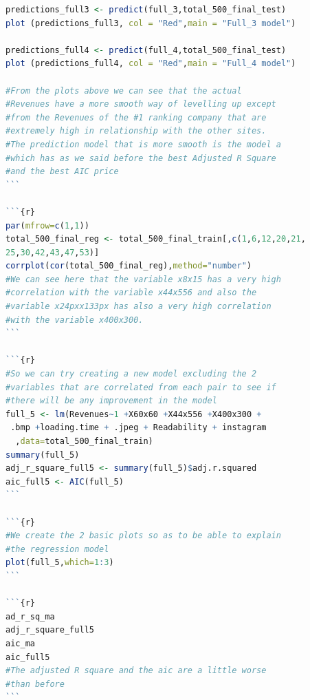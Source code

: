 \documentclass{book}
\begin{document}
\begin{lstlisting}[language=R]
predictions_full3 <- predict(full_3,total_500_final_test)
plot (predictions_full3, col = "Red",main = "Full_3 model")

predictions_full4 <- predict(full_4,total_500_final_test)
plot (predictions_full4, col = "Red",main = "Full_4 model")

#From the plots above we can see that the actual 
#Revenues have a more smooth way of levelling up except 
#from the Revenues of the #1 ranking company that are 
#extremely high in relationship with the other sites.
#The prediction model that is more smooth is the model a 
#which has as we said before the best Adjusted R Square 
#and the best AIC price
```

```{r}
par(mfrow=c(1,1))
total_500_final_reg <- total_500_final_train[,c(1,6,12,20,21,
25,30,42,43,47,53)]
corrplot(cor(total_500_final_reg),method="number")
#We can see here that the variable x8x15 has a very high 
#correlation with the variable x44x556 and also the 
#variable x24pxx133px has also a very high correlation 
#with the variable x400x300.
```

```{r}
#So we can try creating a new model excluding the 2 
#variables that are correlated from each pair to see if 
#there will be any improvement in the model
full_5 <- lm(Revenues~1 +X60x60 +X44x556 +X400x300 +
 .bmp +loading.time + .jpeg + Readability + instagram
  ,data=total_500_final_train)
summary(full_5)
adj_r_square_full5 <- summary(full_5)$adj.r.squared
aic_full5 <- AIC(full_5)
```

```{r}
#We create the 2 basic plots so as to be able to explain 
#the regression model
plot(full_5,which=1:3)
```

```{r}
ad_r_sq_ma
adj_r_square_full5 
aic_ma 
aic_full5 
#The adjusted R square and the aic are a little worse 
#than before
```
\end{lstlisting} 
\end{document}
